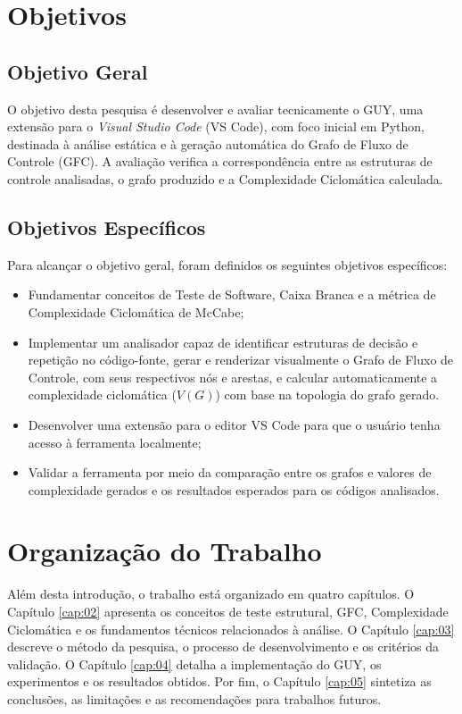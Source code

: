 \section{Objetivos}

\subsection{Objetivo Geral}
O objetivo desta pesquisa é desenvolver e avaliar tecnicamente o GUY, uma extensão para o \textit{Visual Studio Code} (VS Code), com foco inicial em Python, destinada à análise estática e à geração automática do Grafo de Fluxo de Controle (GFC). A avaliação verifica a correspondência entre as estruturas de controle analisadas, o grafo produzido e a Complexidade Ciclomática calculada.

\subsection{Objetivos Específicos}
Para alcançar o objetivo geral, foram definidos os seguintes objetivos específicos:

\begin{itemize}
	\item Fundamentar conceitos de Teste de Software, Caixa Branca e a métrica de Complexidade Ciclomática de McCabe;
    
    \item Implementar um analisador capaz de identificar estruturas de decisão e repetição no código-fonte, gerar e renderizar visualmente o Grafo de Fluxo de Controle, com seus respectivos nós e arestas, e calcular automaticamente a complexidade ciclomática ($V(G)$) com base na topologia do grafo gerado.
	\item Desenvolver uma extensão para o editor VS Code para que o usuário tenha acesso à ferramenta localmente;
	\item Validar a ferramenta por meio da comparação entre os grafos e valores de complexidade gerados e os resultados esperados para os códigos analisados.
\end{itemize}


\section{Organização do Trabalho}
\label{sec:organizacao_trabalho}

Além desta introdução, o trabalho está organizado em quatro capítulos. O Capítulo \ref{cap:02} apresenta os conceitos de teste estrutural, GFC, Complexidade Ciclomática e os fundamentos técnicos relacionados à análise. O Capítulo \ref{cap:03} descreve o método da pesquisa, o processo de desenvolvimento e os critérios da validação. O Capítulo \ref{cap:04} detalha a implementação do GUY, os experimentos e os resultados obtidos. Por fim, o Capítulo \ref{cap:05} sintetiza as conclusões, as limitações e as recomendações para trabalhos futuros.
